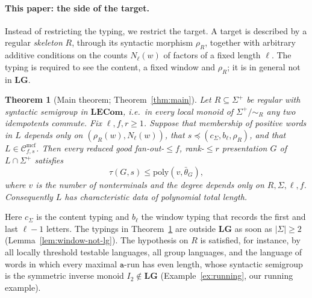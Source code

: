 \documentclass[11pt]{article}
\numberwithin{equation}{section}
\theoremstyle{plain}
\theoremstyle{definition}
\theoremstyle{remark}
\theoremstyle{plain}
\newtheorem{mainthm}{Theorem}
\newcommand{\Cmcf}[2]{\mathcal{C}^{\mathrm{mcf}}_{#1,#2}}
\newcommand{\LG}{\mathbf{LG}}
\newcommand{\LECom}{\mathbf{L}\mathbf{ECom}}
\newcommand{\bth}{\bar\theta}
\begin{document}
\paragraph{This paper: the side of the target.}
Instead of restricting the typing, we restrict the target.  A target is
described by a regular \emph{skeleton} $R$, through its syntactic morphism
$\rho_R$, together with arbitrary additive conditions on the counts $N_\ell(w)$
of factors of a fixed length $\ell$.  The typing is required to see the
content, a fixed window and $\rho_R$; it is in general not in $\LG$.

\begin{mainthm}[Main theorem; Theorem~\ref{thm:main}]
\label{thm:A}
Let $R\subseteq\Sigma^+$ be regular with syntactic semigroup in $\LECom$, i.e.\
in every local monoid of $\Sigma^+/{\sim_R}$ any two idempotents commute.  Fix
$\ell,f,r\ge1$.  Suppose that membership of positive words in $L$ depends only
on $(\rho_R(w),N_\ell(w))$, that $s\preceq(c_\Sigma,b_\ell,\rho_R)$, and that
$L\in\Cmcf{f}{s}$.  Then every reduced good fan-out-$\le f$, rank-$\le r$
presentation $G$ of $L\cap\Sigma^+$ satisfies
\[
  \tau(G,s)\le\mathrm{poly}(v,\bth_G),
\]
where $v$ is the number of nonterminals and the degree depends only on
$R,\Sigma,\ell,f$.  Consequently $L$ has characteristic data of polynomial
total length.
\end{mainthm}

Here $c_\Sigma$ is the content typing and $b_\ell$ the window typing that
records the first and last $\ell-1$ letters.  The typings in
Theorem~\ref{thm:A} are outside $\LG$ as soon as $|\Sigma|\ge2$
(Lemma~\ref{lem:window-not-lg}).  The hypothesis on $R$ is satisfied, for
instance, by all locally threshold testable languages, all group languages,
and the language of words in which every maximal $\mathtt a$-run has even
length, whose syntactic semigroup is the symmetric inverse monoid $I_2\notin\LG$
(Example~\ref{ex:running}, our running example).
\end{document}
